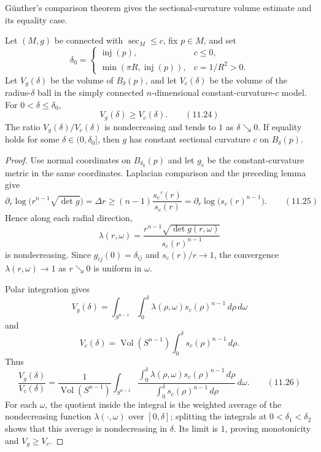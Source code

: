 G\"unther's comparison theorem \cite{Gun60} gives the sectional-curvature
volume estimate and its equality case.

\begin{theorem}
\label{thm:gunther-volume-comparison}

Let $(M,g)$ be connected with $\sec_M\leq c$, fix $p\in M$, and set
\[
\delta_0=
\begin{cases}
\operatorname{inj}(p),&c\leq0,\\
\min(\pi R,\operatorname{inj}(p)),&c=1/R^2>0.
\end{cases}
\]
Let $V_g(\delta)$ be the volume of $B_\delta(p)$, and let $V_c(\delta)$ be the
volume of the radius-$\delta$ ball in the simply connected $n$-dimensional
constant-curvature-$c$ model. For $0<\delta\leq\delta_0$,
\[
V_g(\delta)\geq V_c(\delta). \qquad (11.24)
\]
The ratio $V_g(\delta)/V_c(\delta)$ is nondecreasing and tends to $1$ as
$\delta\searrow0$. If equality holds for some
$\delta\in(0,\delta_0]$, then $g$ has constant sectional curvature $c$ on
$B_\delta(p)$.

\begin{proof}
\sketch Use normal coordinates on $B_{\delta_0}(p)$ and let $g_c$ be the
constant-curvature metric in the same coordinates. Laplacian comparison and
the preceding lemma give
\[
\partial_r\log\bigl(r^{n-1}\sqrt{\det g}\bigr)
=\Delta r
\geq(n-1)\frac{s_c'(r)}{s_c(r)}
=\partial_r\log\bigl(s_c(r)^{n-1}\bigr).
\qquad (11.25)
\]
Hence along each radial direction,
\[
\lambda(r,\omega)
=\frac{r^{n-1}\sqrt{\det g(r,\omega)}}{s_c(r)^{n-1}}
\]
is nondecreasing. Since $g_{ij}(0)=\delta_{ij}$ and $s_c(r)/r\to1$, the
convergence $\lambda(r,\omega)\to1$ as $r\searrow0$ is uniform in $\omega$.

Polar integration gives
\[
V_g(\delta)
=\int_{S^{n-1}}\int_0^\delta
\lambda(\rho,\omega)s_c(\rho)^{n-1}\,d\rho\,d\omega
\]
and
\[
V_c(\delta)
=\operatorname{Vol}(S^{n-1})
  \int_0^\delta s_c(\rho)^{n-1}\,d\rho.
\]
Thus
\[
\frac{V_g(\delta)}{V_c(\delta)}
=\frac1{\operatorname{Vol}(S^{n-1})}
\int_{S^{n-1}}
\frac{\int_0^\delta
\lambda(\rho,\omega)s_c(\rho)^{n-1}\,d\rho}
{\int_0^\delta s_c(\rho)^{n-1}\,d\rho}
\,d\omega.
\qquad (11.26)
\]
For each $\omega$, the quotient inside the integral is the weighted average of
the nondecreasing function $\lambda(\cdot,\omega)$ over $[0,\delta]$; splitting
the integrals at $0<\delta_1<\delta_2$ shows that this average is
nondecreasing in $\delta$. Its limit is $1$, proving monotonicity and
$V_g\geq V_c$.


\end{proof}
\end{theorem}
